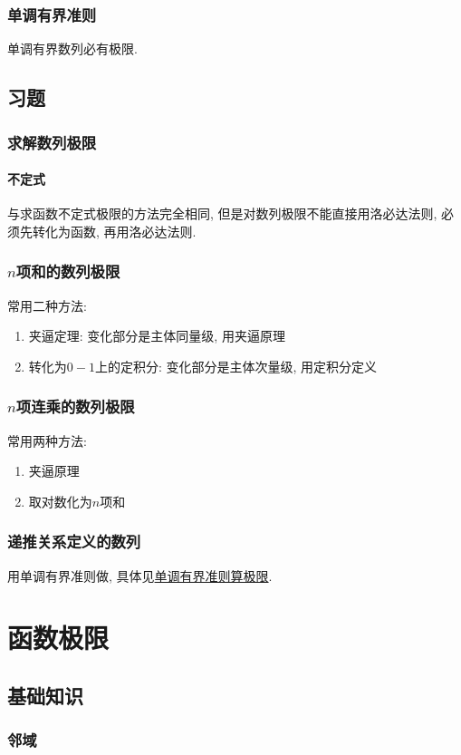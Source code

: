 \subsection{单调有界准则}
单调有界数列必有极限.
\section{习题}
\subsection{求解数列极限}
\subsubsection{不定式}
与求函数不定式极限的方法完全相同, 但是对数列极限不能直接用洛必达法则, 必须先转化为函数, 再用洛必达法则.
\subsection{$ n $项和的数列极限}
常用二种方法:
\begin{enumerate}
    \item 夹逼定理: 变化部分是主体同量级, 用夹逼原理
    \item 转化为$ 0-1 $上的定积分: 变化部分是主体次量级, 用定积分定义
\end{enumerate}
\subsection{$ n $项连乘的数列极限}
常用两种方法:
\begin{enumerate}
    \item 夹逼原理
    \item 取对数化为$ n $项和
\end{enumerate}
\subsection{递推关系定义的数列}
用单调有界准则做, 具体见\hyperref[单调有界准则算极限]{单调有界准则算极限}.
\chapter{函数极限}
\section{基础知识}
\subsection{邻域}
